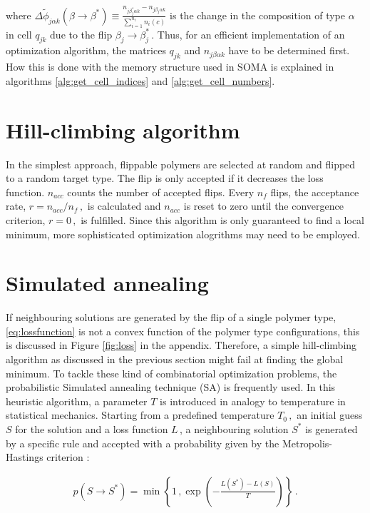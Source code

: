 \documentclass[bachelor,       %
               twoside,        %
               BCOR10mm,       %
               ngerman, english %
               ]{GAUBM}
\begin{document}
where $\Delta\tilde\phi_{ j\alpha k}(\beta\rightarrow\beta^*)\equiv\frac{n_{j\beta_j^*\alpha k}-n_{j\beta_j\alpha k}}{\sum_{i=1}^{n_t}n_i(c)}$ is the change in the composition of type $\alpha$ in cell $q_{jk}$ due to the flip $\beta_j\rightarrow\beta_j^*\,$. Thus, for an efficient implementation of an optimization algorithm, the matrices $q_{jk}$ and $n_{j\beta\alpha k}$ have to be determined first. How this is done with the memory structure used in SOMA is explained in algorithms \ref{alg:get_cell_indices} and \ref{alg:get_cell_numbers}. 

\section{Hill-climbing algorithm}

In the simplest approach, flippable polymers are selected at random and flipped to a random target type. The flip is only accepted if it decreases the loss function. $n_{acc}$ counts the number of accepted flips. Every $n_f$ flips, the acceptance rate, $r=n_{acc}/n_f\,,$ is calculated and $n_{acc}$ is reset to zero until the convergence criterion, $r=0\,,$ is fulfilled. Since this algorithm is only guaranteed to find a local minimum, more sophisticated optimization alogrithms may need to be employed.

\section{Simulated annealing}

If neighbouring solutions are generated by the flip of a single polymer type, \eqref{eq:lossfunction} is not a convex function of the polymer type configurations, this is discussed in Figure \ref{fig:loss} in the appendix. Therefore, a simple hill-climbing algorithm as discussed in the previous section might fail at finding the global minimum. To tackle these kind of combinatorial optimization problems, the probabilistic Simulated annealing technique (SA) \cite{simulated_annealing} is frequently used. In this heuristic algorithm, a parameter $T$ is introduced in analogy to temperature in statistical mechanics. Starting from a predefined temperature $T_0\,,$ an initial guess $S$ for the solution and a loss function $L\,$, a neighbouring solution $S^*$ is generated by a specific rule and accepted with a probability given by the Metropolis-Hastings criterion \cite{metropolis}:

\begin{align}
    p(S\rightarrow S^*)=\min\left\{1\,,\exp\left(-\frac{L(S^*)-L(S)}{T}\right)\right\}\,.
\end{align}
\end{document}

